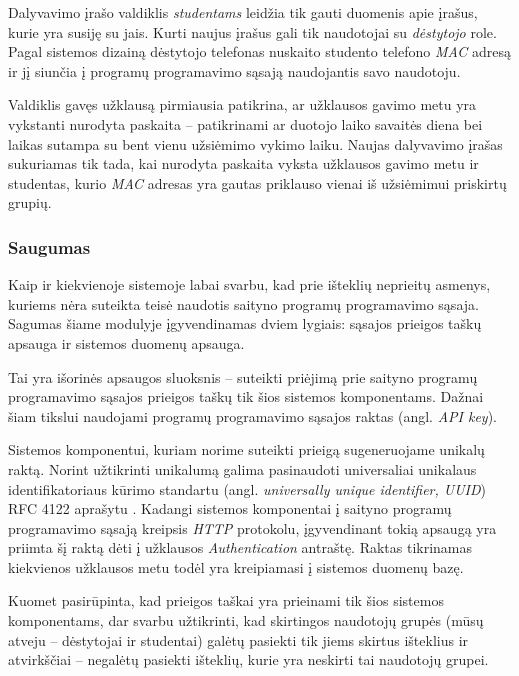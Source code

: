 \documentclass{VUMIFPSkursinis}
\begin{document}
Dalyvavimo įrašo valdiklis \textit{studentams} leidžia tik gauti duomenis apie įrašus, kurie yra susiję su jais. Kurti naujus įrašus gali tik naudotojai su \textit{dėstytojo} role. Pagal sistemos dizainą dėstytojo telefonas nuskaito studento telefono \textit{MAC} adresą ir jį siunčia į programų programavimo sąsają naudojantis savo naudotoju.

Valdiklis gavęs užklausą pirmiausia patikrina, ar užklausos gavimo metu yra vykstanti nurodyta paskaita – patikrinami ar duotojo laiko savaitės diena bei laikas sutampa su bent vienu užsiėmimo vykimo laiku. Naujas dalyvavimo įrašas sukuriamas tik tada, kai nurodyta paskaita vyksta užklausos gavimo metu ir studentas, kurio \textit{MAC} adresas yra gautas priklauso vienai iš užsiėmimui priskirtų grupių.

\subsubsection{Saugumas}

Kaip ir kiekvienoje sistemoje labai svarbu, kad prie išteklių neprieitų asmenys, kuriems nėra suteikta teisė naudotis saityno programų programavimo sąsaja. Sagumas šiame modulyje įgyvendinamas dviem lygiais: sąsajos prieigos taškų apsauga ir sistemos duomenų apsauga.

 \label{apiKeySecurity}

Tai yra išorinės apsaugos sluoksnis – suteikti priėjimą prie saityno programų programavimo sąsajos prieigos taškų tik šios sistemos komponentams. Dažnai šiam tikslui naudojami programų programavimo sąsajos raktas (angl. \textit{API key}).

Sistemos komponentui, kuriam norime suteikti prieigą sugeneruojame unikalų raktą. Norint užtikrinti unikalumą galima pasinaudoti universaliai unikalaus identifikatoriaus kūrimo standartu (angl. \textit{universally unique identifier, UUID}) RFC 4122 aprašytu \cite{uuidRef}. Kadangi sistemos komponentai į saityno programų programavimo sąsają kreipsis \textit{HTTP} protokolu, įgyvendinant tokią apsaugą yra priimta šį raktą dėti į užklausos \textit{Authentication} antraštę. Raktas tikrinamas kiekvienos užklausos metu todėl yra kreipiamasi į sistemos duomenų bazę.


Kuomet pasirūpinta, kad prieigos taškai yra prieinami tik šios sistemos komponentams, dar svarbu užtikrinti, kad skirtingos naudotojų grupės (mūsų atveju – dėstytojai ir studentai) galėtų pasiekti tik jiems skirtus išteklius ir atvirkščiai – negalėtų pasiekti išteklių, kurie yra neskirti tai naudotojų grupei.
\end{document}
